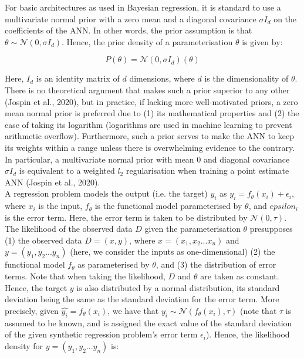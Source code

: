 \documentclass[conference]{IEEEtran}
\begin{document}
For basic architectures as used in Bayesian regression, it is standard to use a multivariate normal prior with a zero mean and a diagonal covariance $\sigma I_d$ on the coefficients of the ANN. In other words, the prior assumption is that $\theta \sim \mathcal{N}(0, \sigma I_d)$. Hence, the prior density of a parameterisation $\theta$ is given by:

\begin{equation*}
	P(\theta) = \mathcal{N}(0, \sigma I_d)(\theta)
\end{equation*}

Here, $I_d$ is an identity matrix of $d$ dimensions, where $d$ is the dimensionality of $\theta$. There is no theoretical argument that makes such a prior superior to any other (Jospin et al., 2020), but in practice, if lacking more well-motivated priors, a zero mean normal prior is preferred due to (1) its mathematical properties and (2) the ease of taking its logarithm (logarithms are used in machine learning to prevent arithmetic overflow). Furthermore, such a prior serves to make the ANN to keep its weights within a range unless there is overwhelming evidence to the contrary. In particular, a multivariate normal prior with mean $0$ and diagonal covariance $\sigma I_d$ is equivalent to a weighted $l_2$ regularisation when training a point estimate ANN (Jospin et al., 2020).\\

A regression problem models the output (i.e. the target) $y_i$ as $y_i = f_\theta(x_i) + \epsilon_i$, where $x_i$ is the input, $f_\theta$ is the functional model parameterised by $\theta$, and $epsilon_i$ is the error term. Here, the error term is taken to be distributed by $\mathcal{N}(0, \tau)$. The likelihood of the observed data $D$ given the parameterisation $\theta$ presupposes (1) the observed data $D = (x, y)$, where $x = (x_1, x_2 ... x_n)$ and $y = (y_1, y_2... y_n)$ (here, we consider the inputs as one-dimensional) (2) the functional model $f_\theta$ as parameterised by $\theta$, and (3) the distribution of error terms. Note that when taking the likelihood, $D$ and $\theta$ are taken as constant. Hence, the target $y$ is also distributed by a normal distribution, its standard deviation being the same as the standard deviation for the error term. More precisely, given $\hat{y_i} = f_\theta(x_i)$, we have that $y_i \sim \mathcal{N}(f_\theta(x_i), \tau)$ (note that $\tau$ is assumed to be known, and is assigned the exact value of the standard deviation of the given synthetic regression problem's error term $\epsilon_i$). Hence, the likelihood density for $y = (y_1, y_2... y_n)$ is:
\end{document}
